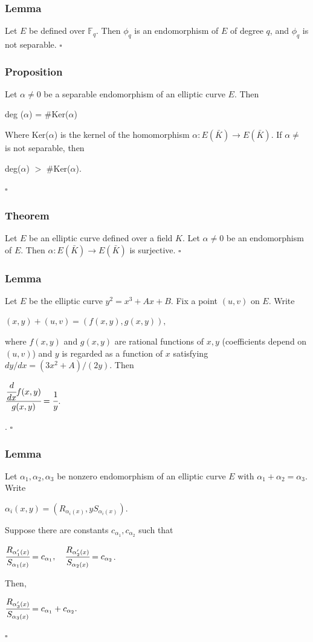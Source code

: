 \documentclass[a4paper, 12pt]{article}
\begin{document}
\subsubsection{Lemma}
Let $E$ be defined over $\mathbb{F}_q$. Then $\phi_q$ is an endomorphism of $E$ of degree $q$, and $\phi_q$ is not separable. $\square$
\subsubsection {Proposition} 
Let $\alpha \neq 0$ be a separable endomorphism of an elliptic curve $E$. Then
\begin{center} deg ($\alpha$) = \#Ker($\alpha$) \end{center}
Where Ker($\alpha$) is the kernel of the homomorphism $\alpha: E(\bar{K}) \rightarrow E(\bar{K})$.\newline
If $\alpha \neq $ is not separable, then
\begin{center} deg($\alpha$) $>$ \#Ker($\alpha$). \end{center} $\square$
\subsubsection{Theorem}
Let $E$ be an elliptic curve defined over a field $K$. Let $\alpha \neq 0$ be an endomorphism of $E$. Then $\alpha : E(\bar{K}) \rightarrow E(\bar{K})$ is surjective. $\square$
\subsubsection{Lemma}
Let $E$ be the elliptic curve $y^2=x^3+Ax+B.$ Fix a point $(u,v)$ on $E$. Write 
\begin{center} $(x,y) + (u,v) = (f(x,y), g(x,y)),$ \end{center}
where $f(x,y)$ and $g(x,y)$ are rational functions of $x,y$ (coefficients depend on $(u,v)$) and $y$ is regarded as a function of $x$ satisfying $dy/dx = (3x^2+A)/(2y)$. Then
\begin{center} $\cfrac{\cfrac{d}{dx}f(x,y)}{g(x,y)} = \cfrac{1}{y}$. \end{center}.
$\square$
\subsubsection {Lemma}
Let $\alpha_1, \alpha_2, \alpha_3$ be nonzero endomorphism of an elliptic curve $E$ with $\alpha_1 + \alpha_2 = \alpha_3$. Write 
\begin{center} $\alpha_i(x,y) = (R_{\alpha_i(x)}, yS_{\alpha_i(x)}).$ \end{center}
Suppose there are constants $c_{\alpha_1}, c_{\alpha_2}$ such that
\begin{center} 
$\cfrac{R_{\alpha_1'(x)}}{S_{\alpha_1(x)}} = c_{\alpha_1}, \quad \cfrac{R_{\alpha_2'(x)}}{S_{\alpha_2(x)}} = c_{\alpha_2}$.
\end{center}
Then,
\begin{center} $\cfrac{R_{\alpha_3'(x)}}{S_{\alpha_3(x)}} = c_{\alpha_1} + c_{\alpha_2}.$ \end{center}
$\square$
\end{document}
